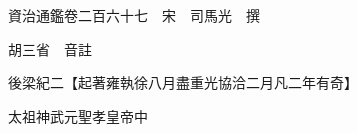 










 


 
 


 

  
  
  
  
  





  
  
  
  
  
 
  

  

  
  
  



  

 
 

  
   




  

  
  


  　　資治通鑑卷二百六十七　宋　司馬光　撰

　　胡三省　音註

　　後梁紀二【起著雍執徐八月盡重光協洽二月凡二年有奇】

　　太祖神武元聖孝皇帝中

